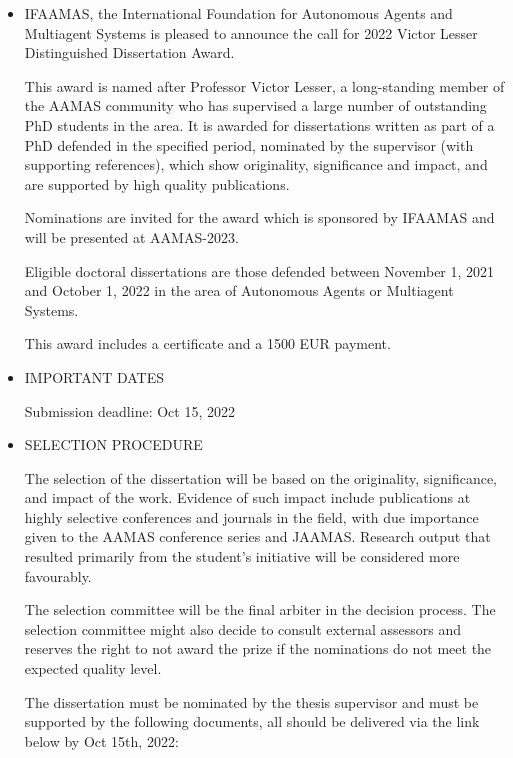 \documentclass[prodmode,acmtecs]{acmsmall} %
\begin{document}
\begin{itemize}\item  IFAAMAS, the International Foundation for Autonomous Agents and Multiagent Systems is pleased to announce the call for 2022 Victor Lesser Distinguished Dissertation Award.  
 
  This award is named after Professor Victor Lesser, a long-standing member of the AAMAS community who has supervised a large number of outstanding PhD students in the area. It is awarded for dissertations written as part of a PhD defended in the specified period, nominated by the supervisor (with supporting references), which show originality, significance and impact, and are supported by high quality publications. 
 
  Nominations are invited for the award which is sponsored by IFAAMAS and will be presented at AAMAS-2023. 
 
  Eligible doctoral dissertations are those defended between November 1, 2021 and October 1, 2022 in the area of Autonomous Agents or Multiagent Systems. 
 
  This award includes a certificate and a 1500 EUR payment. 
 
\item  IMPORTANT DATES  
 
Submission deadline: Oct 15, 2022 
 
\item  SELECTION PROCEDURE 
 
  The selection of the dissertation will be based on the originality, significance, and impact of the work. Evidence of such impact include publications at highly selective conferences and journals in the field, with due importance given to the AAMAS conference series and JAAMAS. Research output that resulted primarily from the student's initiative will be considered more favourably.  
 
  The selection committee will be the final arbiter in the decision process. The selection committee might also decide to consult external assessors and reserves the right to not award the prize if the nominations do not meet the expected quality level. 
 
  The dissertation must be nominated by the thesis supervisor and must be supported by the following documents, all should be delivered via the link below by Oct 15th, 2022: 
 

\end{itemize}
\end{document}
